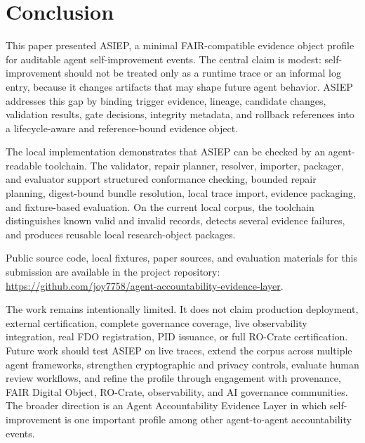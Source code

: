 \section{Conclusion}

This paper presented ASIEP, a minimal FAIR-compatible evidence object profile for auditable agent self-improvement events. The central claim is modest: self-improvement should not be treated only as a runtime trace or an informal log entry, because it changes artifacts that may shape future agent behavior. ASIEP addresses this gap by binding trigger evidence, lineage, candidate changes, validation results, gate decisions, integrity metadata, and rollback references into a lifecycle-aware and reference-bound evidence object.

The local implementation demonstrates that ASIEP can be checked by an agent-readable toolchain. The validator, repair planner, resolver, importer, packager, and evaluator support structured conformance checking, bounded repair planning, digest-bound bundle resolution, local trace import, evidence packaging, and fixture-based evaluation. On the current local corpus, the toolchain distinguishes known valid and invalid records, detects several evidence failures, and produces reusable local research-object packages.

Public source code, local fixtures, paper sources, and evaluation materials for this submission are available in the project repository: \url{https://github.com/joy7758/agent-accountability-evidence-layer}.

The work remains intentionally limited. It does not claim production deployment, external certification, complete governance coverage, live observability integration, real FDO registration, PID issuance, or full RO-Crate certification. Future work should test ASIEP on live traces, extend the corpus across multiple agent frameworks, strengthen cryptographic and privacy controls, evaluate human review workflows, and refine the profile through engagement with provenance, FAIR Digital Object, RO-Crate, observability, and AI governance communities. The broader direction is an Agent Accountability Evidence Layer in which self-improvement is one important profile among other agent-to-agent accountability events.
